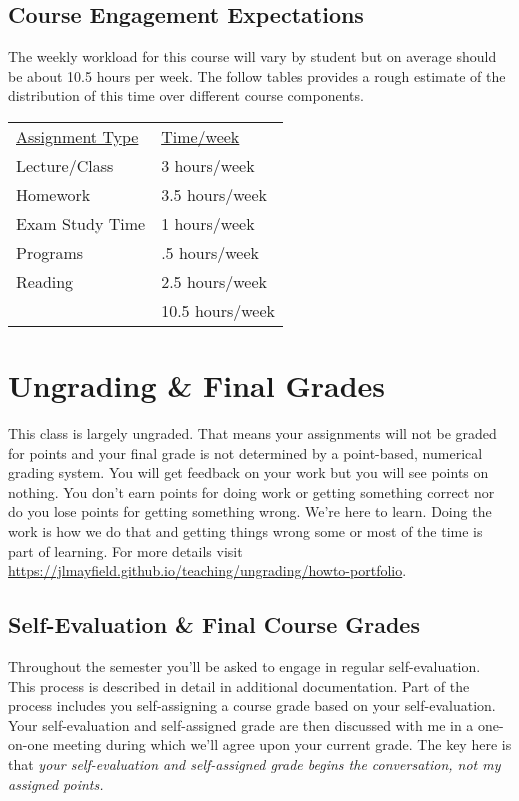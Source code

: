 \documentclass[10pt]{article}
\begin{document}
\subsection{Course Engagement Expectations}

The weekly workload for this course will vary by student but on average should be about 10.5 hours per week.  The follow tables provides a rough estimate of the distribution of this time over different course components.
\begin{center}
\begin{tabular}{ll}
\underline{Assignment Type} & \underline{Time/week} \\
Lecture/Class      & 3 hours/week \\
Homework          & 3.5 hours/week \\
Exam Study Time    & 1 hours/week \\
Programs          & .5 hours/week \\
Reading &  2.5 hours/week \\
\bottomrule
 & 10.5 hours/week
\end{tabular}
\end{center}


\section{Ungrading \& Final Grades}

This class is largely ungraded. That means your assignments will not be graded for points and your final grade
is not determined by a point-based, numerical grading system. You will get feedback on your work but you will
see points on nothing. You don't earn points for doing work or getting something correct nor do you lose points
for getting something wrong. We're here to learn. Doing the work is how we do that and getting things wrong
some or most of the time is part of learning. For more details visit \url{https://jlmayfield.github.io/teaching/ungrading/howto-portfolio}.

\subsection{Self-Evaluation \& Final Course Grades}

Throughout the semester you'll be asked to engage in regular self-evaluation. This process is described in
detail in additional documentation. Part of the process includes you self-assigning a course grade based on
your self-evaluation. Your self-evaluation and self-assigned grade are then discussed with me in a one-on-one
meeting during which we'll agree upon your current grade. The key here is that \textit{your self-evaluation
and self-assigned grade begins the conversation, not my assigned points.}
\end{document}

